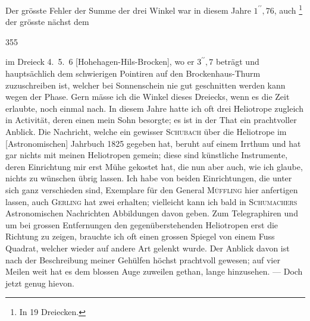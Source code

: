 Der grösste Fehler der Summe der drei Winkel war in diesem Jahre \(1^{\prime\prime}{,}76\), auch \footnote{In 19 Dreiecken.} der grösste nächst dem
\par\clearpage
{}\hfill355\par\medskip
\noindent im Dreieck 4.~5.~6 [Hohehagen-Hils-Brocken], wo er \(3^{\prime\prime}{,}7\) beträgt und hauptsächlich dem schwierigen Pointiren auf den Brockenhaus-Thurm zuzuschreiben ist, welcher bei Sonnenschein nie gut geschnitten werden kann wegen der Phase.
Gern mässe ich die Winkel dieses Dreiecks, wenn es die Zeit erlaubte, noch einmal nach.
In diesem Jahre hatte ich oft drei Heliotrope zugleich in Activität, deren einen mein Sohn besorgte; es ist in der That ein prachtvoller Anblick.
Die Nachricht, welche ein gewisser \textsc{Schubach} über die Heliotrope im [Astronomischen] Jahrbuch 1825 gegeben hat, beruht auf einem Irrthum und hat gar nichts mit meinen Heliotropen gemein; diese sind künstliche Instrumente, deren Einrichtung mir erst  Mühe gekostet hat, die nun aber auch, wie ich glaube, nichts zu wünschen übrig lassen.
Ich habe von beiden Einrichtungen, die unter sich ganz verschieden sind, Exemplare für den General \textsc{Müffling} hier anfertigen lassen, auch \textsc{Gerling} hat zwei erhalten; vielleicht kann ich bald in \textsc{Schumachers} Astronomischen Nachrichten Abbildungen davon geben.
Zum Telegraphiren und um bei grossen Entfernungen den gegenüberstehenden Heliotropen erst die Richtung zu zeigen, brauchte ich oft einen grossen Spiegel von einem Fuss Quadrat, welcher wieder auf andere Art gelenkt wurde.
Der Anblick davon ist nach der Beschreibung meiner Gehülfen höchst prachtvoll gewesen; auf vier Meilen weit hat es dem blossen Auge zuweilen  gethan, lange hinzusehen. --- Doch jetzt genug hievon.

